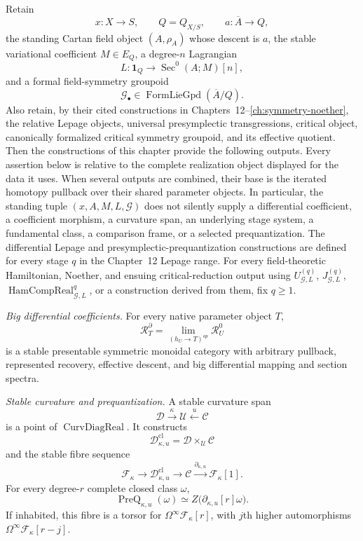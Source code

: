 \begin{theorem}
\label{thm:prequantum-final-package}
Retain
\[
x:X\to S,
\qquad
Q=Q_{X/S},
\qquad
a:\overline A\to Q,
\]
the standing Cartan field object $(A,\rho_A)$ whose descent is $a$, the stable
variational coefficient $M\in E_Q$, a degree-$n$ Lagrangian
\[
L:\mathbf1_Q\to\operatorname{Sec}^0(A;M)[n],
\]
and a formal field-symmetry groupoid
\[
\mathcal G_\bullet\in\operatorname{FormLieGpd}(\overline A/Q).
\]
Also retain, by their cited constructions in Chapters~12--\ref{ch:symmetry-noether},
the relative Lepage objects, universal presymplectic transgressions, critical
object, canonically formalized critical symmetry groupoid, and its effective
quotient.  Then the constructions of this chapter provide the following outputs.
Every assertion below is relative to the complete realization object displayed
for the data it uses.  When several outputs are combined, their base is the
iterated homotopy pullback over their shared parameter objects.  In particular,
the standing tuple $(x,A,M,L,\mathcal G)$ does not silently supply a differential
coefficient, a coefficient morphism, a curvature span, an underlying stage
system, a fundamental class, a comparison frame, or a selected prequantization.
The differential Lepage and presymplectic-prequantization constructions are
defined for every stage $q$ in the Chapter~12 Lepage range.  For every
field-theoretic Hamiltonian, Noether, and ensuing critical-reduction output using
$U_{\mathcal G,L}^{(q)}$, $J_{\mathcal G,L}^{(q)}$,
$\operatorname{HamCompReal}_{\mathcal G,L}^{q}$, or a construction derived from
them, fix $q\ge1$.

\medskip
\noindent\emph{Big differential coefficients.}
For every native parameter object $T$,
\[
\mathcal R_T^{\partial}
=
\lim_{(h_U\to T)^{op}}\mathcal R_U^0
\]
is a stable presentable symmetric monoidal category with arbitrary pullback,
represented recovery, effective descent, and big differential mapping and section
spectra.

\medskip
\noindent\emph{Stable curvature and prequantization.}
A stable curvature span
\[
\mathscr D\xrightarrow{\kappa}\mathscr U\xleftarrow{u}\mathscr C
\]
is a point of $\operatorname{CurvDiagReal}$.  It constructs
\[
\mathscr D^{\mathrm{cl}}_{\kappa,u}
=
\mathscr D\times_{\mathscr U}\mathscr C
\]
and the stable fibre sequence
\[
\mathscr F_\kappa
\longrightarrow
\mathscr D^{\mathrm{cl}}_{\kappa,u}
\longrightarrow
\mathscr C
\xrightarrow{\partial_{\kappa,u}}
\mathscr F_\kappa[1].
\]
For every degree-$r$ complete closed class $\omega$,
\[
\boxed{
\operatorname{PreQ}_{\kappa,u}(\omega)
\simeq
Z\bigl(\partial_{\kappa,u}[r]\omega\bigr).
}
\]
If inhabited, this fibre is a torsor for
$\Omega^\infty\mathscr F_\kappa[r]$, with $j$th higher automorphisms
$\Omega^\infty\mathscr F_\kappa[r-j]$.


\end{theorem}
